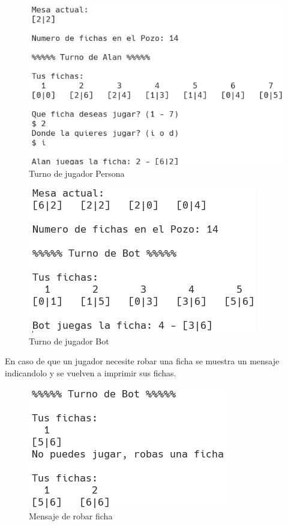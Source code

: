 \documentclass[12pt]{article}
\begin{document}
  \begin{figure}[h!]
    \centering 
    \includegraphics{pf4.png}
    \caption{Turno de jugador Persona}
  \end{figure}

  \begin{figure}[h!]
    \centering
    \includegraphics{pf5.png}
    \caption{Turno de jugador Bot}
  \end{figure}
  
  En caso de que un jugador necesite robar una ficha se muestra un mensaje indicandolo y se vuelven a imprimir sus fichas.

  \begin{figure}[h!]
    \centering
    \includegraphics{pf6.png}
    \caption{Mensaje de robar ficha} 
  \end{figure}
\end{document}
